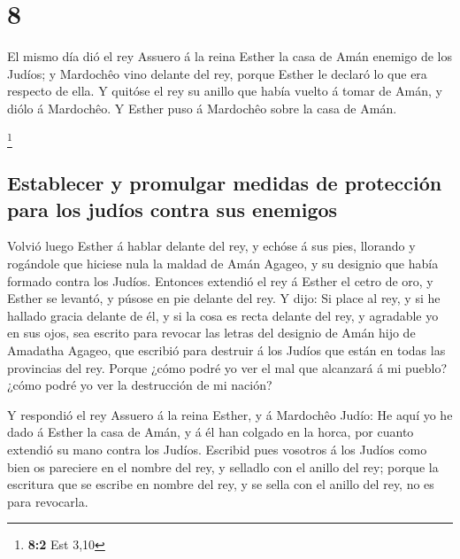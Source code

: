 \hypertarget{section-7}{%
\section{8}\label{section-7}}

 El mismo día dió el rey Assuero á la reina Esther la casa
de Amán enemigo de los Judíos; y Mardochêo vino delante del rey, porque
Esther le declaró lo que era respecto de ella.  Y quitóse el
rey su anillo que había vuelto á tomar de Amán, y diólo á Mardochêo. Y
Esther puso á Mardochêo sobre la casa de Amán.

\footnote{\textbf{8:2} Est 3,10}

\hypertarget{establecer-y-promulgar-medidas-de-protecciuxf3n-para-los-juduxedos-contra-sus-enemigos}{%
\subsection{Establecer y promulgar medidas de protección para los judíos
contra sus
enemigos}\label{establecer-y-promulgar-medidas-de-protecciuxf3n-para-los-juduxedos-contra-sus-enemigos}}

 Volvió luego Esther á hablar delante del rey, y echóse á
sus pies, llorando y rogándole que hiciese nula la maldad de Amán
Agageo, y su designio que había formado contra los Judíos. 
Entonces extendió el rey á Esther el cetro de oro, y Esther se levantó,
y púsose en pie delante del rey.  Y dijo: Si place al rey, y
si he hallado gracia delante de él, y si la cosa es recta delante del
rey, y agradable yo en sus ojos, sea escrito para revocar las letras del
designio de Amán hijo de Amadatha Agageo, que escribió para destruir á
los Judíos que están en todas las provincias del rey. 
Porque ¿cómo podré yo ver el mal que alcanzará á mi pueblo? ¿cómo podré
yo ver la destrucción de mi nación?

 Y respondió el rey Assuero á la reina Esther, y á Mardochêo
Judío: He aquí yo he dado á Esther la casa de Amán, y á él han colgado
en la horca, por cuanto extendió su mano contra los Judíos. 
Escribid pues vosotros á los Judíos como bien os pareciere en el nombre
del rey, y selladlo con el anillo del rey; porque la escritura que se
escribe en nombre del rey, y se sella con el anillo del rey, no es para
revocarla.

